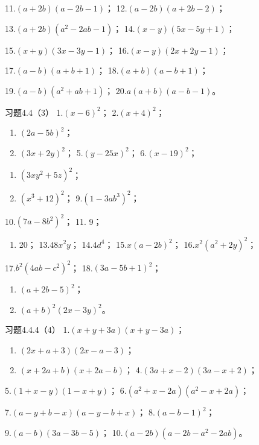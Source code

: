 11.\((a + 2b)(a - 2b - 1)\)； 12.\((a - 2b)(a + 2b - 2)\)；

13.\((a + 2b)(a^2 - 2ab - 1)\)； 14.\((x - y)(5x - 5y + 1)\)；

15.\((x + y)(3x - 3y - 1)\)； 16.\((x - y)(2x + 2y - 1)\)；

17.\((a - b)(a + b + 1)\)； 18.\((a + b)(a - b + 1)\)；

19.\((a - b)(a^2 + ab + 1)\)； 20.\(a(a + b)(a - b - 1)\)。

习题4.4（3） 1.\((x - 6)^{2}\)； 2.\((x + 4)^{2}\)；
\begin{enumerate}[start=3]
\item
  \((2a - 5b)^{2}\)；
\item
  \((3x + 2y)^{2}\)； 5.\((y - 25x)^{2}\)； 6.\((x - 19)^{2}\)；
\end{enumerate}
\begin{enumerate}[start=7]
\item
  \((3xy^{2} + 5z)^{2}\)；
\item
  \((x^{3} + 12)^{2}\)； 9.\((1 - 3ab^{3})^{2}\)；
\end{enumerate}
10.\((7a - 8b^{2})^{2}\)； 11. 9；

\begin{enumerate}[start=12]
\item
  20； 13.\(48x^{2}y\)； 14.\(4d^{4}\)； 15.\(x(a - 2b)^{2}\)；
  16.\(x^{2}(a^{2} + 2y)^{2}\)；
\end{enumerate}

17.\(b^{2}(4ab - c^{2})^{2}\)； 18.\((3a - 5b + 1)^{2}\)；
\begin{enumerate}[start=19]
\item
  \((a + 2b - 5)^{2}\)；
\item
  \((a + b)^{2}(2x - 3y)^{2}\)。
\end{enumerate}

习题4.4.4（4） 1.\((x + y + 3a)(x + y - 3a)\)；
\begin{enumerate}[start=2]
\item
  \((2x + a + 3)(2x - a - 3)\)；
\item
  \((x + 2a + b)(x + 2a - b)\)； 4.\((3a + x - 2)(3a - x + 2)\)；
\end{enumerate}

5.\((1 + x - y)(1 - x + y)\)； 6.\((a^2 + x - 2a)(a^2 - x + 2a)\)；

7.\((a - y + b - x)(a - y - b + x)\)； 8.\((a - b - 1)^2\)；

9.\((a - b)(3a - 3b - 5)\)； 10.\((a - 2b)(a - 2b - a^2 - 2ab)\)。

